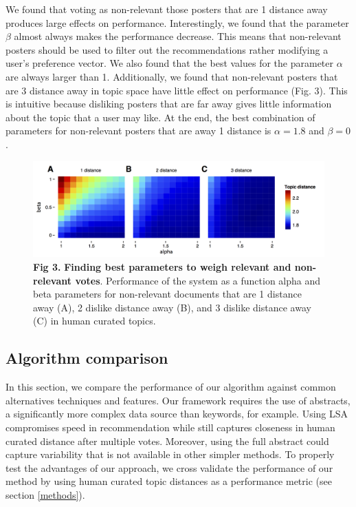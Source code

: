 \documentclass[a4paper]{article}
\begin{document}
We found that voting as non-relevant those posters that are 1 distance away produces large effects on performance. Interestingly, we found that the parameter $\beta$ almost always makes the performance decrease. This means that non-relevant posters should be used to filter out the recommendations rather modifying a user’s preference vector. We also found that the best values for the parameter $\alpha$ are always larger than 1. Additionally, we found that non-relevant posters that are 3 distance away in topic space have little effect on performance (Fig. 3). This is intuitive because disliking posters that are far away gives little information about the topic that a user may like. At the end, the best combination of parameters for non-relevant posters that are away 1 distance is $\alpha=1.8$ and $\beta=0$.


\begin{figure}[!ht]
\centering
\includegraphics[width=5in]{alpha_beta_relation}
\caption*{\textbf{Fig 3.} \textbf{Finding best parameters to weigh relevant and non-relevant votes}. Performance of the system as a function alpha and beta parameters for non-relevant documents that are 1 distance away (A), 2 dislike distance away (B), and 3 dislike distance away (C) in human curated topics.}
\end{figure}

\subsection{Algorithm comparison}

In this section, we compare the performance of our algorithm against common alternatives techniques and features. Our framework requires the use of abstracts, a significantly more complex data source than keywords, for example. Using LSA compromises speed in recommendation while still captures closeness in human curated distance after multiple votes. Moreover, using the full abstract could capture variability that is not available in other simpler methods. To properly test the advantages of our approach, we cross validate the performance of our method by using human curated topic distances as a performance metric (see section \ref{methods}).
\end{document}
